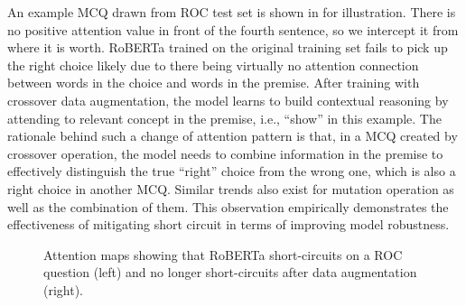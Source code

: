 An example MCQ drawn from ROC test set is shown in  for
illustration. There is no positive attention value in front of the fourth sentence, so we intercept it from where it is worth. RoBERTa trained on the original training set fails to pick up the right choice likely due to there being virtually no attention connection between words in the choice and words in the premise. After training with crossover data augmentation, the model learns to build contextual reasoning  by attending to relevant concept in the premise, i.e., ``show'' in this example. The rationale behind such a change of attention pattern is that, in a MCQ created by crossover operation, the model needs to combine information in the premise to effectively distinguish the true ``right'' choice from the wrong one, which is also a right choice in another MCQ. Similar trends also exist for mutation operation as well as the combination of them. This observation empirically demonstrates the effectiveness of mitigating short circuit in terms of improving model robustness.  


\begin{figure}[th]
\centering
{\setlength{\fboxsep}{0pt}
\hfill
{}
}
\caption{Attention maps showing that RoBERTa short-circuits on a ROC
question (left) and no longer short-circuits after data augmentation (right).}
\label{fig:case_study}
\end{figure}
